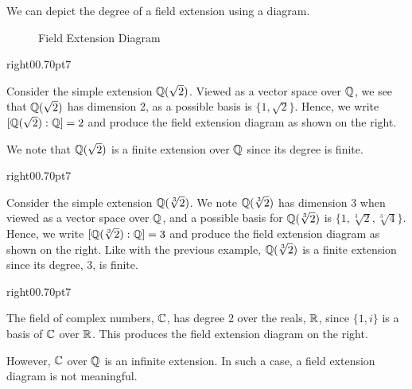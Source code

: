 We can depict the degree of a field extension using a diagram.
\begin{figure}[H]
    \centering
    \caption{Field Extension Diagram}
\end{figure}

\begin{examplewithcutout}{right}{0}{0.7\textwidth}{0pt}{7}{
    \begin{figure}[H]
        \centering
    \end{figure}
}
    Consider the simple extension $\mathbb{Q}(\sqrt2)$. Viewed as a vector space over $\mathbb{Q}$, we see that $\mathbb{Q}(\sqrt 2)$ has dimension 2, as a possible basis is $\{1, \sqrt2\}$. Hence, we write $[\mathbb{Q}(\sqrt2):\mathbb{Q}] = 2$ and produce the field extension diagram as shown on the right.

    We note that $\mathbb{Q}(\sqrt2)$ is a finite extension over $\mathbb{Q}$ since its degree is finite.
\end{examplewithcutout}

\begin{examplewithcutout}{right}{0}{0.7\textwidth}{0pt}{7}{
    \begin{figure}[H]
        \centering
    \end{figure}
}
    Consider the simple extension $\mathbb{Q}(\sqrt[3]2)$. We note $\mathbb{Q}(\sqrt[3]2)$ has dimension 3 when viewed as a vector space over $\mathbb{Q}$, and a possible basis for $\mathbb{Q}(\sqrt[3]2)$ is $\{1, \sqrt[3]2, \sqrt[3]4\}$. Hence, we write $[\mathbb{Q}(\sqrt[3]2):\mathbb{Q}] = 3$ and produce the field extension diagram as shown on the right. Like with the previous example, $\mathbb{Q}(\sqrt[3]2)$ is a finite extension since its degree, 3, is finite.
\end{examplewithcutout}

\begin{examplewithcutout}{right}{0}{0.7\textwidth}{0pt}{7}{
    \begin{figure}[H]
        \centering
    \end{figure}
}
    The field of complex numbers, $\mathbb{C}$, has degree 2 over the reals, $\mathbb{R}$, since $\{1, i\}$ is a basis of $\mathbb{C}$ over $\mathbb{R}$. This produces the field extension diagram on the right.

    However, $\mathbb{C}$ over $\mathbb{Q}$ is an infinite extension. In such a case, a field extension diagram is not meaningful.
\end{examplewithcutout}

